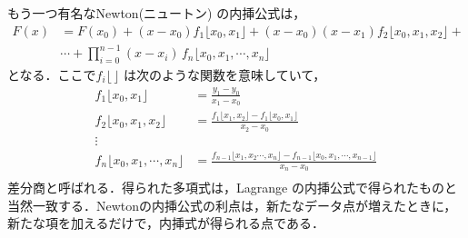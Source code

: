 もう一つ有名なNewton(ニュートン) の内挿公式は，
\begin{equation*}
\begin{array}{rc}
F (x )&=F (x _{0})+
(x -x _{0})f _{1}\lfloor x_0,x_1\rfloor+
(x -x _{0})(x -x _{1})
f _{2}\lfloor x_0,x_1,x_2\rfloor + \\
& \cdots + \displaystyle \prod_{i=0}^{n-1} (x-x_i) \, 
f_n \lfloor x_0,x_1,\cdots,x_n \rfloor
\end{array}
\end{equation*}
となる．ここで$f_i \lfloor\, \rfloor$ は次のような関数を意味していて，
\begin{equation*}
\begin{array}{rl}
f _{1}\lfloor x_0,x_1\rfloor &= \displaystyle \frac{y_1-y_0}{x_1-x_0} \\
f _{2}\lfloor x_0,x_1,x_2\rfloor &= \displaystyle \frac{f _{1}\lfloor x_1,x_2\rfloor-
f _{1}\lfloor x_0,x_1\rfloor}{x_2-x_0} \\
\vdots & \\
f _{n}\lfloor x_0,x_1,\cdots,x_n\rfloor &= \displaystyle \frac{f_{n-1}\lfloor x_1,x_2\cdots,x_{n}\rfloor-
f _{n-1}\lfloor x_0,x_1,\cdots,x_{n-1}\rfloor}{x_n-x_0} \\
\end{array}
\end{equation*}
差分商と呼ばれる．得られた多項式は，Lagrange の内挿公式で得られたものと当然一致する．Newtonの内挿公式の利点は，新たなデータ点が増えたときに，新たな項を加えるだけで，内挿式が得られる点である．

